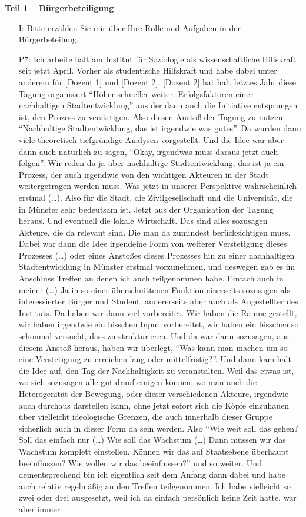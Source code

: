 \textbf{Teil 1 -- B{\"u}rgerbeteiligung}
\begin{itemize}
    \item[I:] Bitte erz{\"a}hlen Sie mir {\"u}ber Ihre Rolle und Aufgaben in der B{\"u}rgerbeteilung.
    \item[P7:] Ich arbeite halt am Institut f{\"u}r Soziologie als wissenschaftliche Hilfskraft seit jetzt April. Vorher als studentische Hilfskraft und habe dabei unter anderem f{\"u}r [Dozent 1] und [Dozent 2]. [Dozent 2] hat halt letztes Jahr diese Tagung organisiert "`H{\"o}her schneller weiter. Erfolgsfaktoren einer nachhaltigen Stadtentwicklung"' aus der dann auch die Initiative entsprungen ist, den Prozess zu verstetigen. Also diesen Ansto{\ss} der Tagung zu nutzen. "`Nachhaltige Stadtentwicklung, das ist irgendwie was gutes"'. Da wurden dann viele theoretisch tiefgr{\"u}ndige Analysen vorgestellt. Und die Idee war aber dann auch nat{\"u}rlich zu sagen, "`Okay, irgendwas muss daraus jetzt auch folgen"'. Wir reden da ja {\"u}ber nachhaltige Stadtentwicklung, das ist ja ein Prozess, der auch irgendwie von den wichtigen Akteuren in der Stadt weitergetragen werden muss. Was jetzt in unserer Perspektive wahrscheinlich erstmal (\dots). Also f{\"u}r die Stadt, die Zivilgesellschaft und die Universit{\"a}t, die in M{\"u}nster sehr bedeutsam ist. Jetzt aus der Organisation der Tagung heraus. Und eventuell die lokale Wirtschaft. Das sind alles sozusagen Akteure, die da relevant sind. Die man da zumindest ber{\"u}cksichtigen muss. Dabei war dann die Idee irgendeine Form von weiterer Verstetigung dieses Prozesses (\dots) oder eines Ansto{\ss}es dieses Prozesses hin zu einer nachhaltigen Stadtentwicklung in M{\"u}nster erstmal vorzunehmen, und deswegen gab es im Anschluss Treffen an denen ich auch teilgenommen habe. Einfach auch in meiner (\dots) Ja in so einer {\"u}berschnittenen Funktion einerseits sozusagen als interessierter B{\"u}rger und Student, andererseits aber auch als Angestellter des Instituts. Da haben wir dann viel vorbereitet. Wir haben die R{\"a}ume gestellt, wir haben irgendwie ein bisschen Input vorbereitet, wir haben ein bisschen so schonmal versucht, dass zu strukturieren. Und da war dann sozusagen, aus diesem Ansto{\ss} heraus, haben wir {\"u}berlegt, "`Was kann man machen um so eine Verstetigung zu erreichen lang oder mittelfristig?"'. Und dann kam halt die Idee auf, den Tag der Nachhaltigkeit zu veranstalten. Weil das etwas ist, wo sich sozusagen alle gut drauf einigen k{\"o}nnen, wo man auch die Heterogenit{\"a}t der Bewegung, oder dieser verschiedenen Akteure, irgendwie auch durchaus darstellen kann, ohne jetzt sofort sich die K{\"o}pfe einzuhauen {\"u}ber vielleicht ideologische Grenzen, die auch innerhalb dieser Gruppe sicherlich auch in dieser Form da sein werden. Also "`Wie weit soll das gehen? Soll das einfach nur (\dots) Wie soll das Wachstum (\dots) Dann m{\"u}ssen wir das Wachstum komplett einstellen. K{\"o}nnen wir das auf Staatsebene {\"u}berhaupt beeinflussen? Wie wollen wir das beeinflussen?"' und so weiter. Und dementsprechend bin ich eigentlich seit dem Anfang dann dabei und habe auch relativ regelm{\"a}{\ss}ig an den Treffen teilgenommen. Ich habe vielleicht so zwei oder drei ausgesetzt, weil ich da einfach pers{\"o}nlich keine Zeit hatte, war aber immer 
\end{itemize}
